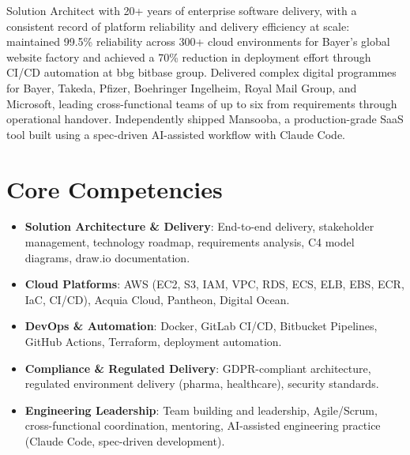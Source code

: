 \documentclass[11pt,a4paper,sans]{moderncv}
\begin{document}
\makecvtitle


\vspace{6pt}
\small{Solution Architect with 20+ years of enterprise software delivery, with a consistent record of platform reliability and delivery efficiency at scale: maintained 99.5\% reliability across 300+ cloud environments for Bayer's global website factory and achieved a 70\% reduction in deployment effort through CI/CD automation at bbg bitbase group. Delivered complex digital programmes for Bayer, Takeda, Pfizer, Boehringer Ingelheim, Royal Mail Group, and Microsoft, leading cross-functional teams of up to six from requirements through operational handover. Independently shipped Mansooba, a production-grade SaaS tool built using a spec-driven AI-assisted workflow with Claude Code.}


\section{Core Competencies}
\vspace{1pt}
\begin{itemize}

\item \textbf{Solution Architecture \& Delivery}: End-to-end delivery, stakeholder management, technology roadmap, requirements analysis, C4 model diagrams, draw.io documentation.

\item \textbf{Cloud Platforms}: AWS (EC2, S3, IAM, VPC, RDS, ECS, ELB, EBS, ECR, IaC, CI/CD), Acquia Cloud, Pantheon, Digital Ocean.

\item \textbf{DevOps \& Automation}: Docker, GitLab CI/CD, Bitbucket Pipelines, GitHub Actions, Terraform, deployment automation.

\item \textbf{Compliance \& Regulated Delivery}: GDPR-compliant architecture, regulated environment delivery (pharma, healthcare), security standards.

\item \textbf{Engineering Leadership}: Team building and leadership, Agile/Scrum, cross-functional coordination, mentoring, AI-assisted engineering practice (Claude Code, spec-driven development).

\end{itemize}
\end{document}
